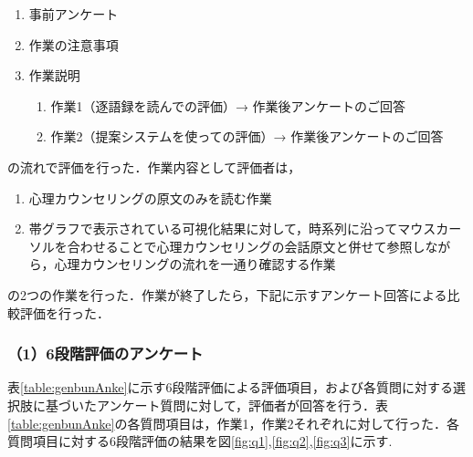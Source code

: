 \documentclass[shuuron]{kuee}
\begin{document}
\begin{enumerate}

  \item 事前アンケート
  \item 作業の注意事項
  \item 作業説明
  \begin{enumerate}

    \item 作業1（逐語録を読んでの評価）→ 作業後アンケートのご回答
    \item 作業2（提案システムを使っての評価）→ 作業後アンケートのご回答
  \end{enumerate}
\end{enumerate}
の流れで評価を行った．作業内容として評価者は，
\begin{enumerate}

  \item 心理カウンセリングの原文のみを読む作業
  \item 帯グラフで表示されている可視化結果に対して，時系列に沿ってマウスカーソルを合わせることで心理カウンセリングの会話原文と併せて参照しながら，心理カウンセリングの流れを一通り確認する作業
\end{enumerate}
の2つの作業を行った．作業が終了したら，下記に示すアンケート回答による比較評価を行った．





\subsubsection{（1）6段階評価のアンケート}

表\ref{table:genbunAnke}に示す6段階評価による評価項目，および各質問に対する選択肢に基づいたアンケート質問に対して，評価者が回答を行う．表\ref{table:genbunAnke}の各質問項目は，作業1，作業2それぞれに対して行った．各質問項目に対する6段階評価の結果を図\ref{fig:q1},\ref{fig:q2},\ref{fig:q3}に示す.
\end{document}
